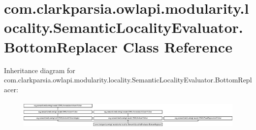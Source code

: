 \hypertarget{classcom_1_1clarkparsia_1_1owlapi_1_1modularity_1_1locality_1_1_semantic_locality_evaluator_1_1_bottom_replacer}{\section{com.\-clarkparsia.\-owlapi.\-modularity.\-locality.\-Semantic\-Locality\-Evaluator.\-Bottom\-Replacer Class Reference}
\label{classcom_1_1clarkparsia_1_1owlapi_1_1modularity_1_1locality_1_1_semantic_locality_evaluator_1_1_bottom_replacer}
}
Inheritance diagram for com.\-clarkparsia.\-owlapi.\-modularity.\-locality.\-Semantic\-Locality\-Evaluator.\-Bottom\-Replacer\-:\begin{figure}[H]
\begin{center}
\leavevmode
\includegraphics[height=1.490353cm]{classcom_1_1clarkparsia_1_1owlapi_1_1modularity_1_1locality_1_1_semantic_locality_evaluator_1_1_bottom_replacer}
\end{center}
\end{figure}
